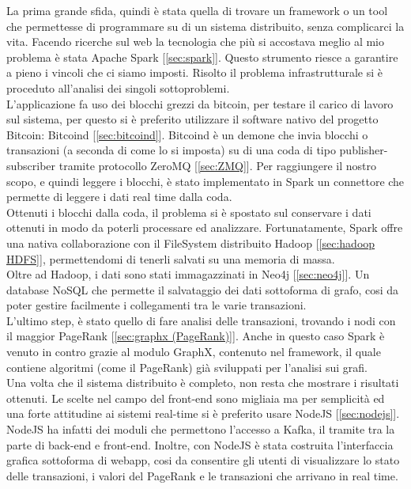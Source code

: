 La prima grande sfida, quindi è stata quella di trovare un framework o un tool che permettesse di programmare su di un sistema distribuito, senza complicarci la vita. Facendo ricerche sul web la tecnologia che più si accostava meglio al mio problema è stata Apache Spark [\ref{sec:spark}]. Questo strumento riesce a garantire a pieno i vincoli che ci siamo imposti. Risolto il problema infrastrutturale si è proceduto all'analisi dei singoli sottoproblemi. 
\\L'applicazione fa uso dei blocchi grezzi da bitcoin, per testare il carico di lavoro sul sistema, per questo si è preferito utilizzare il software nativo del progetto Bitcoin: Bitcoind [\ref{sec:bitcoind}]. Bitcoind è un demone che invia blocchi o transazioni (a seconda di come lo si imposta) su di una coda di tipo publisher-subscriber tramite protocollo ZeroMQ [\ref{sec:ZMQ}]. Per raggiungere il nostro scopo, e quindi leggere i blocchi, è stato implementato in Spark un connettore che permette di leggere i dati real time dalla coda.
\\Ottenuti i blocchi dalla coda, il problema si è spostato sul conservare i dati ottenuti in modo da poterli processare ed analizzare. Fortunatamente, Spark offre una nativa collaborazione con il FileSystem distribuito Hadoop [\ref{sec:hadoop HDFS}], permettendomi di tenerli salvati su una memoria di massa.
\\Oltre ad Hadoop, i dati sono stati immagazzinati in Neo4j [\ref{sec:neo4j}]. Un database NoSQL che permette il salvataggio dei dati sottoforma di grafo, cosi da poter gestire facilmente i collegamenti tra le varie transazioni.
\\L'ultimo step, è stato quello di fare analisi delle transazioni, trovando i nodi con il maggior PageRank [\ref{sec:graphx (PageRank)}]. Anche in questo caso Spark è venuto in contro grazie al modulo GraphX, contenuto nel framework, il quale contiene algoritmi (come il PageRank) già sviluppati per l'analisi sui grafi.  
\\Una volta che il sistema distribuito è completo, non resta che mostrare i risultati ottenuti. Le scelte nel campo del front-end sono migliaia ma per semplicità ed una forte attitudine ai sistemi real-time si è preferito usare NodeJS [\ref{sec:nodejs}]. NodeJS ha infatti dei moduli che permettono l'accesso a Kafka, il tramite tra la parte di back-end e front-end. Inoltre, con NodeJS è stata costruita l'interfaccia grafica sottoforma di webapp, cosi da consentire gli utenti di visualizzare lo stato delle transazioni, i valori del PageRank e le transazioni che arrivano in real time.








